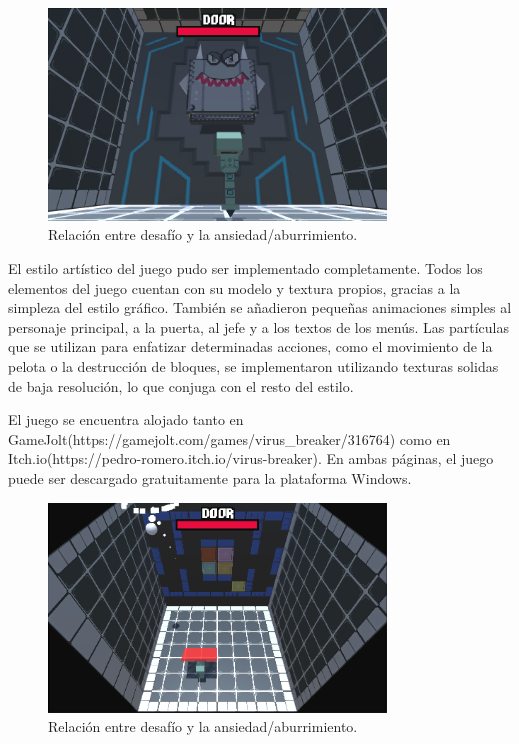 \begin{figure}[h]
	\includegraphics[width=0.8\textwidth]{images/futuro/resultado/captura-boss}
	\centering
	\caption{Relación entre desafío y la ansiedad/aburrimiento.}
\end{figure}

El estilo artístico del juego pudo ser implementado completamente. Todos los elementos del juego cuentan con su modelo y textura propios, gracias a la simpleza del estilo gráfico. También se añadieron pequeñas animaciones simples al personaje principal, a la puerta, al jefe y a los textos de los menús. Las partículas que se utilizan para enfatizar determinadas acciones, como el movimiento de la pelota o la destrucción de bloques, se implementaron utilizando texturas solidas de baja resolución, lo que conjuga con el resto del estilo. 

El juego se encuentra alojado tanto en GameJolt(https://gamejolt.com/games/virus\_breaker/316764) como en Itch.io(https://pedro-romero.itch.io/virus-breaker). En ambas páginas, el juego puede ser descargado gratuitamente para la plataforma Windows.

\begin{figure}[h]
	\includegraphics[width=0.8\textwidth]{images/futuro/resultado/captura-pacman}
	\centering
	\caption{Relación entre desafío y la ansiedad/aburrimiento.}
\end{figure}

